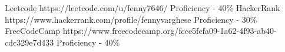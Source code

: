 
\begin{envcvpro}
    \cvprotwo
        {Leetcode}
        {https://leetcode.com/u/fenny7646/}
        {Proficiency - 40\%}
    \cvprotwo
        {HackerRank}
        {https://www.hackerrank.com/profile/fennyvarghese}
        {Proficiency - 30\%}
    \cvprotwo
        {FreeCodeCamp}
        {https://www.freecodecamp.org/fcce5fcfa09-1a62-4f93-ab40-cdc329e7d433}
        {Proficiency - 40\%}
\end{envcvpro}